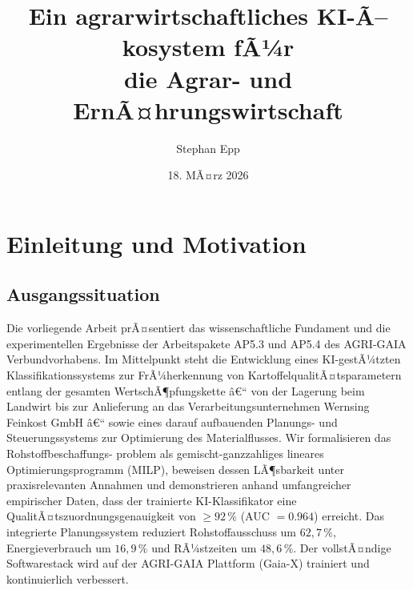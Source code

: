 ﻿\documentclass[12pt,a4paper]{article}
\title{Ein agrarwirtschaftliches KI-Ã–kosystem fÃ¼r\\
	die Agrar- und ErnÃ¤hrungswirtschaft}
\author{Stephan Epp}
\date{18. MÃ¤rz 2026}
\theoremstyle{plain}
\theoremstyle{definition}
\begin{document}

	\maketitle
	
	\tableofcontents
	\newpage
		
	\section{Einleitung und Motivation}
	
	\subsection{Ausgangssituation}
	Die vorliegende Arbeit prÃ¤sentiert das wissenschaftliche Fundament und die
	experimentellen Ergebnisse der Arbeitspakete AP5.3 und AP5.4 des AGRI-GAIA
	Verbundvorhabens. Im Mittelpunkt steht die Entwicklung eines KI-gestÃ¼tzten
	Klassifikationssystems zur FrÃ¼herkennung von KartoffelqualitÃ¤tsparametern
	entlang der gesamten WertschÃ¶pfungskette â€“ von der Lagerung beim Landwirt
	bis zur Anlieferung an das Verarbeitungsunternehmen Wernsing Feinkost GmbH
	â€“ sowie eines darauf aufbauenden Planungs- und Steuerungssystems zur
	Optimierung des Materialflusses. Wir formalisieren das Rohstoffbeschaffungs-
	problem als gemischt-ganzzahliges lineares Optimierungsprogramm (MILP),
	beweisen dessen LÃ¶sbarkeit unter praxisrelevanten Annahmen und demonstrieren
	anhand umfangreicher empirischer Daten, dass der trainierte KI-Klassifikator
	eine QualitÃ¤tszuordnungsgenauigkeit von $\geq 92\,\%$ (AUC $= 0.964$)
	erreicht. Das integrierte Planungssystem reduziert Rohstoffausschuss um
	$62,7\,\%$, Energieverbrauch um $16,9\,\%$ und RÃ¼stzeiten um $48,6\,\%$.
	Der vollstÃ¤ndige Softwarestack wird auf der AGRI-GAIA Plattform (Gaia-X)
	trainiert und kontinuierlich verbessert.
	
\end{document}
